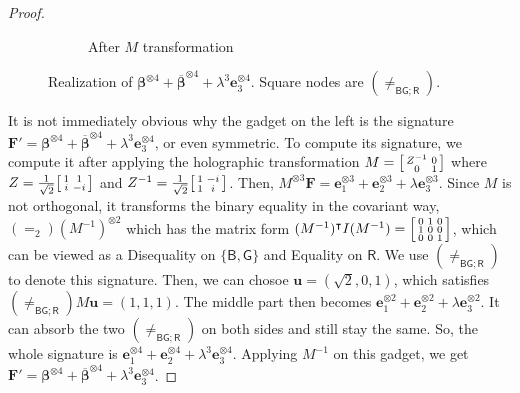 \documentclass[11pt]{article}
\newcommand{\db}{\mathsf{B}}
\newcommand{\dg}{\mathsf{G}}
\newcommand{\dr}{\mathsf{R}}
\newcommand{\teh}{^{\otimes 3}}
\newcommand{\tew}{^{\otimes 2}}
\newcommand{\transpose}{^\intercal}
\begin{document}
\begin{proof}
\begin{figure}
\begin{subfigure}[b]{0.55\textwidth}
    \caption{After $M$ transformation}
  \end{subfigure}
    \caption{Realization of $ \boldsymbol{\beta}^{\otimes 4} + \overline{\boldsymbol{\beta}}^{\otimes 4} + \lambda^3 \mathbf{e}_3^{\otimes 4}$. Square nodes are $(\ne_{\db\dg;\dr})$.} \label{fig:Z-normalization}
  \end{figure}
  It is not immediately obvious why the gadget on the left is the signature $\mathbf{F}' = \boldsymbol{\beta}^{\otimes 4} + \overline{\boldsymbol{\beta}}^{\otimes 4} + \lambda^3 \mathbf{e}_3^{\otimes 4}$, or even symmetric.
  To compute its signature, we compute it after applying the holographic transformation $M = \begin{bsmallmatrix}
    Z^{-1} & 0 \\
    0 & 1
    \end{bsmallmatrix}$ where $Z = \frac{1}{\sqrt{2}} \begin{bsmallmatrix}
    1 & 1 \\
    i & -i
    \end{bsmallmatrix}$ and $Z^{-1} = \frac{1}{\sqrt{2}}\begin{bsmallmatrix}
    1 & -i \\
    1 & i
  \end{bsmallmatrix}$.
  Then, $M\teh \mathbf{F} = \mathbf{e}_1 \teh + \mathbf{e}_2 \teh + \lambda \mathbf{e}_3 \teh$.
  Since $M$ is not orthogonal, it transforms the binary equality in the covariant way, $(=_2) (M^{-1})\tew$ which has the matrix form $(M^{-1})\transpose I (M^{-1}) = \begin{bsmallmatrix}
    0 & 1 & 0 \\
    1 & 0 & 0 \\
    0 & 0 & 1
  \end{bsmallmatrix}$, which can be viewed as a Disequality on $\{\db, \dg\}$ and Equality on $\dr$. We use $(\ne_{\db \dg; \dr})$ to denote this signature.
  Then, we can chosoe $\mathbf{u} = (\sqrt{2}, 0, 1)$, which satisfies $(\ne_{\db \dg; \dr}) M \mathbf{u} = (1, 1, 1)$.
  The middle part then becomes $\mathbf{e}_1 \tew + \mathbf{e}_2 \tew + \lambda \mathbf{e}_3 \tew$.
  It can absorb the two $(\ne_{\db \dg ; \dr})$ on both sides and still stay the same.
  So, the whole signature is $\mathbf{e}_1^{\otimes 4} + \mathbf{e}_2^{\otimes 4} + \lambda^3 \mathbf{e}_3^{\otimes 4}$.
  Applying $M^{-1}$ on this gadget, we get $\mathbf{F}' = \boldsymbol{\beta}^{\otimes 4} + \overline{\boldsymbol{\beta}}^{\otimes 4} + \lambda^3 \mathbf{e}_3 ^{\otimes 4}$.


\end{proof}
\end{document}

